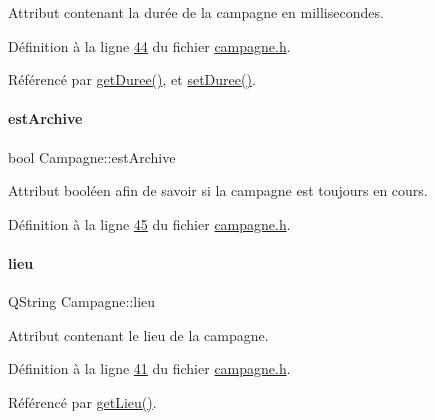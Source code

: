 Attribut contenant la durée de la campagne en millisecondes. 



Définition à la ligne \hyperlink{campagne_8h_source_l00044}{44} du fichier \hyperlink{campagne_8h_source}{campagne.\+h}.



Référencé par \hyperlink{campagne_8cpp_source_l00044}{get\+Duree()}, et \hyperlink{campagne_8cpp_source_l00049}{set\+Duree()}.

\mbox{\label{class_campagne_a6ff3284dd54897c32c2ab9478f1f50ec}} 
\paragraph{\texorpdfstring{est\+Archive}{estArchive}}
{\footnotesize\ttfamily bool Campagne\+::est\+Archive\hspace{0.3cm}{\ttfamily [private]}}



Attribut booléen afin de savoir si la campagne est toujours en cours. 



Définition à la ligne \hyperlink{campagne_8h_source_l00045}{45} du fichier \hyperlink{campagne_8h_source}{campagne.\+h}.

\mbox{\label{class_campagne_a1df66832d5d700bfd2bd36fe548f7cba}} 
\paragraph{\texorpdfstring{lieu}{lieu}}
{\footnotesize\ttfamily Q\+String Campagne\+::lieu\hspace{0.3cm}{\ttfamily [private]}}



Attribut contenant le lieu de la campagne. 



Définition à la ligne \hyperlink{campagne_8h_source_l00041}{41} du fichier \hyperlink{campagne_8h_source}{campagne.\+h}.



Référencé par \hyperlink{campagne_8cpp_source_l00034}{get\+Lieu()}.

\mbox{\label{class_campagne_ac460df42e2fbc12aae7b97abbe219ad0}} 
